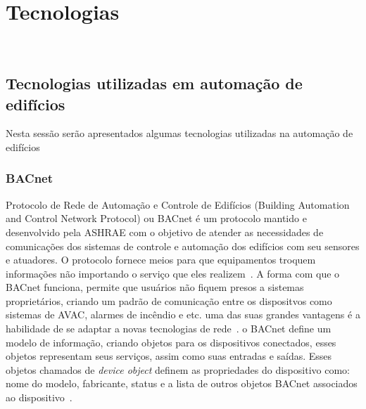 \section{Tecnologias}
~\label{tecnologias}

\subsection{Tecnologias utilizadas em automação de edifícios}
Nesta sessão serão apresentados algumas tecnologias utilizadas na automação de edifícios

\subsubsection{BACnet}
Protocolo de Rede de Automação e Controle de Edifícios (Building Automation and Control Network Protocol) ou BACnet é um protocolo 
mantido e desenvolvido pela ASHRAE com o objetivo de atender as necessidades de comunicações dos sistemas de controle e automação 
dos edifícios com seu sensores e atuadores. O protocolo fornece meios para que equipamentos troquem informações não importando o 
serviço que eles realizem~\cite{ASHRAE135}. A forma com que o BACnet funciona, permite que usuários não fiquem presos a sistemas 
proprietários, criando um padrão de comunicação entre os dispositvos como sistemas de AVAC, alarmes de incêndio e etc. uma das suas 
grandes vantagens é a habilidade de se adaptar a novas tecnologias de rede~\cite{Bushby2002}.
o BACnet define um modelo de informação, criando objetos para os dispositivos conectados, esses objetos representam seus serviços, 
assim como suas entradas e saídas. Esses objetos chamados de \emph{device object} definem as propriedades do dispositivo como: nome do modelo,
fabricante, status e a lista de outros objetos BACnet associados ao dispositivo~\cite{Domingues2016}.

